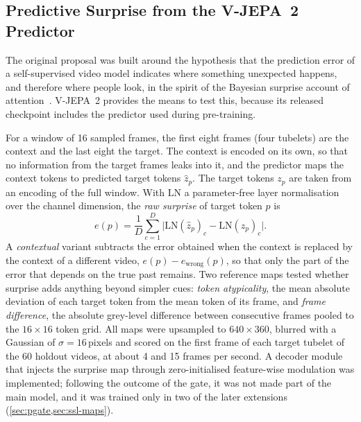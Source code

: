 \subsection{Predictive Surprise from the V-JEPA~2 Predictor}\label{sec:surprise}

The original proposal was built around the hypothesis that the prediction
error of a self-supervised video model indicates where something unexpected
happens, and therefore where people look, in the spirit of the Bayesian
surprise account of attention~\cite{itti2009bayesian}. \acrshort{V-JEPA}~2 provides the
means to test this, because its released checkpoint includes the predictor
used during pre-training.

For a window of 16 sampled frames, the first eight frames (four tubelets) are
the context and the last eight the target. The context is encoded on its own,
so that no information from the target frames leaks into it, and the
predictor maps the context tokens to predicted target tokens $\hat z_p$. The
target tokens $z_p$ are taken from an encoding of the full window. With
$\mathrm{LN}$ a parameter-free layer normalisation over the channel dimension,
the \emph{raw surprise} of target token $p$ is
\begin{equation}
  e(p) = \frac{1}{D}\sum_{c=1}^{D}\big|\mathrm{LN}(\hat z_p)_c - \mathrm{LN}(z_p)_c\big|.
  \label{eq:surprise}
\end{equation}
A \emph{contextual} variant subtracts the error obtained when the context is
replaced by the context of a different video, $e(p)-e_{\mathrm{wrong}}(p)$, so
that only the part of the error that depends on the true past remains. Two
reference maps tested whether surprise adds anything beyond simpler cues:
\emph{token atypicality}, the mean absolute deviation of each target token
from the mean token of its frame, and \emph{frame difference}, the absolute
grey-level difference between consecutive frames pooled to the $16\times16$
token grid. All maps were upsampled to $640\times360$, blurred with a Gaussian
of $\sigma=16$\,pixels and scored on the first frame of each target tubelet of
the 60 holdout videos, at about 4 and 15 frames per second. A decoder module
that injects the surprise map through zero-initialised feature-wise
modulation was implemented; following the outcome of the gate, it was not
made part of the main model, and it was trained only in two of the later
extensions (\cref{sec:pgate,sec:ssl-maps}).

